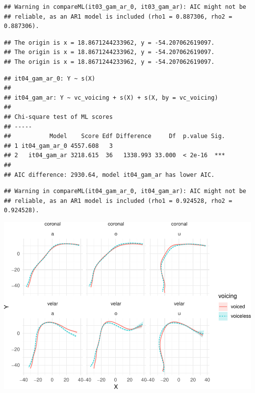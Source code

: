 \documentclass[12pt,]{article}
\begin{document}
\begin{verbatim}
## Warning in compareML(it03_gam_ar_0, it03_gam_ar): AIC might not be
## reliable, as an AR1 model is included (rho1 = 0.887306, rho2 = 0.887306).
\end{verbatim}

\begin{verbatim}
## The origin is x = 18.8671244233962, y = -54.207062619097.
## The origin is x = 18.8671244233962, y = -54.207062619097.
## The origin is x = 18.8671244233962, y = -54.207062619097.
\end{verbatim}

\begin{verbatim}
## it04_gam_ar_0: Y ~ s(X)
## 
## it04_gam_ar: Y ~ vc_voicing + s(X) + s(X, by = vc_voicing)
## 
## Chi-square test of ML scores
## -----
##           Model    Score Edf Difference     Df  p.value Sig.
## 1 it04_gam_ar_0 4557.608   3                                
## 2   it04_gam_ar 3218.615  36   1338.993 33.000  < 2e-16  ***
## 
## AIC difference: 2930.64, model it04_gam_ar has lower AIC.
\end{verbatim}

\begin{verbatim}
## Warning in compareML(it04_gam_ar_0, it04_gam_ar): AIC might not be
## reliable, as an AR1 model is included (rho1 = 0.924528, rho2 = 0.924528).
\end{verbatim}

\begin{center}\includegraphics{2018-polar-gam_files/figure-latex/unnamed-chunk-1-1} \end{center}
\end{document}
